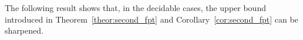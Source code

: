 \documentclass[12pt]{article}
\theoremstyle{definition}
\newtheorem{lemma}{Lemma}[theorem]
\begin{document}
The following result shows that, in the decidable cases, the upper bound introduced in Theorem~\ref{theor:second_fpt} and Corollary~\ref{cor:second_fpt} can be sharpened.

\end{document}
